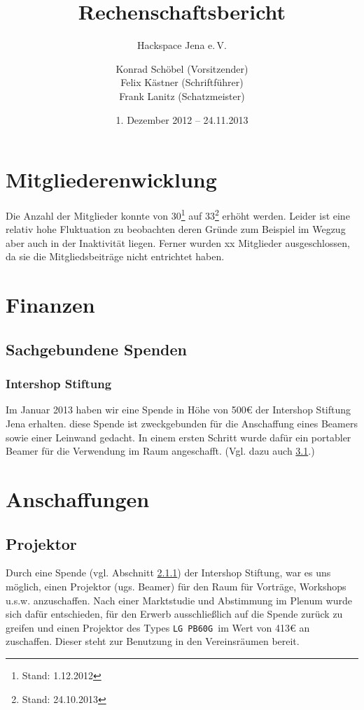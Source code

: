 \documentclass[10pt,DIV16]{scrartcl}
\title{Rechenschaftsbericht}
\subtitle{Hackspace Jena e.\,V.}
\author{%
	Konrad Schöbel (Vorsitzender)\\
    Felix Kästner (Schriftführer)\\
	Frank Lanitz (Schatzmeister)
}
\date{1. Dezember 2012 -- 24.11.2013}
\begin{document}
\maketitle{}

\tableofcontents{}

\newpage{}

\section{Mitgliederenwicklung}

Die Anzahl der Mitglieder konnte von 30\footnote{Stand: 1.12.2012} auf
33\footnote{Stand: 24.10.2013} erhöht werden. Leider ist eine relativ
hohe Fluktuation zu beobachten deren Gründe zum Beispiel im Wegzug aber
auch in der Inaktivität liegen. Ferner wurden xx Mitglieder
ausgeschlossen, da sie die Mitgliedsbeiträge nicht entrichtet haben.

\section{Finanzen}

\subsection{Sachgebundene Spenden}
\subsubsection{Intershop Stiftung}
\label{sec:iss-spende}
Im Januar 2013 haben wir eine Spende in Höhe von 500\euro{} der Intershop
Stiftung Jena erhalten. diese Spende ist zweckgebunden für die
Anschaffung eines Beamers sowie einer Leinwand gedacht. In einem
ersten Schritt wurde dafür ein portabler Beamer für die Verwendung
im Raum angeschafft. (Vgl. dazu auch \ref{sec:beamerkauf}.)

\section{Anschaffungen}


\subsection{Projektor}
\label{sec:beamerkauf}

Durch eine Spende (vgl. Abschnitt \ref{sec:iss-spende}) der
Intershop Stiftung, war es uns möglich, einen Projektor (ugs. Beamer) für den Raum
für Vorträge, Workshops u.s.w. anzuschaffen. Nach einer Marktstudie
und Abstimmung im Plenum wurde sich dafür entschieden, für den
Erwerb ausschließlich auf die Spende zurück zu greifen und einen
Projektor des Types \texttt{LG PB60G }im Wert von 413\euro{} an
zuschaffen. Dieser steht zur Benutzung in den Vereinsräumen bereit.
\end{document}
